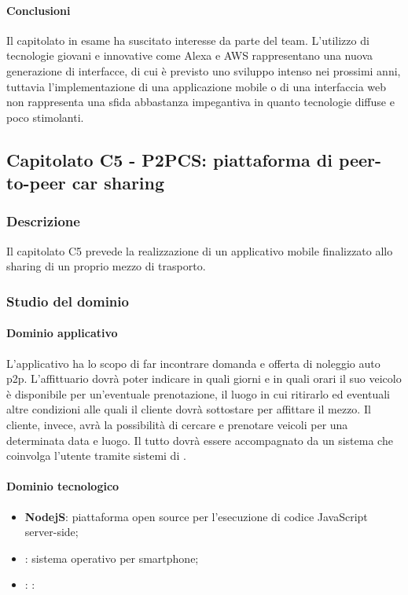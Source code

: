 	\paragraph{Conclusioni} \Spazio
	Il capitolato in esame ha suscitato interesse da parte del team. L'utilizzo di tecnologie giovani e innovative come Alexa e AWS rappresentano una nuova generazione di interfacce, di cui è previsto uno sviluppo intenso nei prossimi anni, tuttavia l'implementazione di una applicazione mobile o di una interfaccia web non rappresenta una sfida abbastanza impegantiva in quanto tecnologie diffuse e poco stimolanti.
	
	\subsection{Capitolato C5 - P2PCS: piattaforma di peer-to-peer car sharing}
		\subsubsection{Descrizione}
		Il capitolato C5 prevede la realizzazione di un applicativo mobile finalizzato allo sharing  di un proprio mezzo di trasporto.
		\subsubsection{Studio del dominio}
			\paragraph{Dominio applicativo} \Spazio
			L'applicativo ha lo scopo di far incontrare domanda e offerta di noleggio auto p2p. L'affittuario dovrà poter indicare in quali giorni e in quali orari il suo veicolo è disponibile per un'eventuale prenotazione, il luogo in cui ritirarlo ed eventuali altre condizioni alle quali il cliente dovrà sottostare per affittare il mezzo.
			Il cliente, invece, avrà la possibilità di cercare e prenotare veicoli per una determinata data e luogo. Il tutto dovrà essere accompagnato da un sistema che coinvolga l'utente tramite sistemi di .
			\paragraph{Dominio tecnologico} \Spazio
				\begin{itemize}
					\item  \textbf{NodejS}: piattaforma open source per l'esecuzione di codice JavaScript server-side;
					\item \textbf{}: sistema operativo per smartphone;
					\item \textbf{}: :
				\end{itemize}
